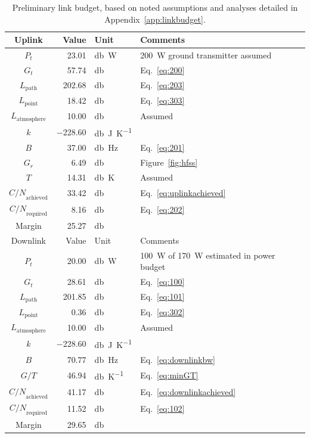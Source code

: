 \documentclass[9pt]{article}
\begin{document}
\begin{table}[h]
  \centering
  \captionsetup{width=.75\linewidth,font=small,labelfont=bf}
  \begin{tabular}{c|rl|l}
    \toprule
    Uplink & Value & Unit & Comments \\
    \midrule
    $P_t$ & \num{23.01} & \si{\decibel\watt} & \qty{200}{\watt} ground transmitter assumed\\
    $G_t$ & \num{57.74} & \si{\decibel} & Eq.~\ref{eq:200}\\
    $L_\text{path}$ & \num{202.68} & \si{\decibel} & Eq.~\ref{eq:203}\\
    $L_\text{point}$ & \num{18.42} & \si{\decibel} & Eq.~\ref{eq:303}\\
    $L_\text{atmosphere}$ & \num{10.00} & \si{\decibel} & Assumed\\
    $k$ & \num{-228.60} & \si{\decibel\joule\per\kelvin} & \\
    $B$ & \num{37.00} & \si{\decibel\hertz} & Eq.~\ref{eq:201}\\
    $G_r$ & \num{6.49} & \si{\decibel} & Figure~\ref{fig:hfss}\\
    $T$ & \num{14.31} & \si{\decibel\kelvin} & Assumed\\
    \midrule
    ${C/N}_\text{achieved}$ & \num{33.42} & \si{\decibel} & Eq.~\ref{eq:uplinkachieved}\\
    ${C/N}_\text{required}$ & \num{8.16} & \si{\decibel} & Eq.~\ref{eq:202}\\
    \midrule
    Margin & \num{25.27} & \si{\decibel}& \\
    \bottomrule \toprule
    Downlink & Value & Unit & Comments\\
    \midrule
    $P_t$ & \num{20.00} & \si{\decibel\watt} & \qty{100}{\watt} of \qty{170}{\watt} estimated in power budget\\
    $G_t$ & \num{28.61} & \si{\decibel} & Eq.~\ref{eq:100}\\
    $L_\text{path}$ & \num{201.85} & \si{\decibel} & Eq.~\ref{eq:101}\\
    $L_\text{point}$ & \num{0.36} & \si{\decibel} & Eq.~\ref{eq:302}\\
    $L_\text{atmosphere}$ & \num{10.00} & \si{\decibel} & Assumed\\
    $k$ & \num{-228.60} & \si{\decibel\joule\per\kelvin} & \\
    $B$ & \num{70.77} & \si{\decibel\hertz} & Eq.~\ref{eq:downlinkbw}\\
    $G/T$ & \num{46.94} & \si{\decibel\per\kelvin} & Eq.~\ref{eq:minGT}\\
    \midrule
    ${C/N}_\text{achieved}$ & \num{41.17} & \si{\decibel} & Eq.~\ref{eq:downlinkachieved}\\
    ${C/N}_\text{required}$ & \num{11.52} & \si{\decibel} & Eq.~\ref{eq:102}\\
    \midrule
    Margin & \num{29.65} & \si{\decibel} & \\
    \bottomrule
  \end{tabular}
  \caption{Preliminary link budget, based on noted assumptions and analyses detailed in Appendix~\ref{app:linkbudget}.}
  \label{tab:link}
\end{table}
\end{document}
